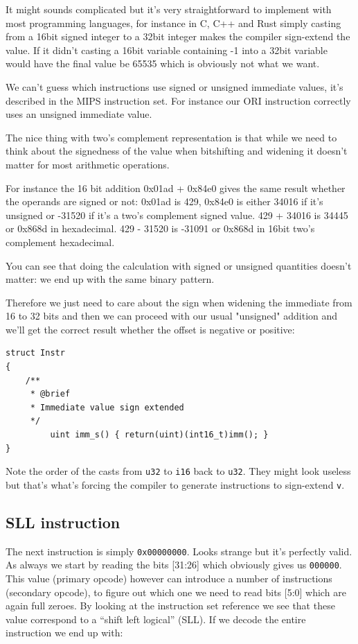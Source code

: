 \documentclass[a4paper]{article}
\newcommand{\code}[1] {\texttt{#1}}
\begin{document}
It might sounds complicated but it's very straightforward to implement
with most programming languages, for instance in C, C++ and Rust
simply casting from a 16bit signed integer to a 32bit integer makes
the compiler sign-extend the value. If it didn't casting a 16bit
variable containing -1 into a 32bit variable would have the final
value be 65535 which is obviously not what we want.

We can't guess which instructions use signed or unsigned immediate
values, it's described in the MIPS instruction set. For instance our
ORI instruction correctly uses an unsigned immediate value.

The nice thing with two's complement representation is that while we
need to think about the signedness of the value when bitshifting and
widening it doesn't matter for most arithmetic operations.

For instance the 16 bit addition 0x01ad + 0x84e0 gives the same result
whether the operands are signed or not: 0x01ad is 429, 0x84e0 is
either 34016 if it's unsigned or -31520 if it's a two's complement
signed value. 429 + 34016 is 34445 or 0x868d in hexadecimal. 429 -
31520 is -31091 or 0x868d in 16bit two's complement hexadecimal.

You can see that doing the calculation with signed or unsigned
quantities doesn't matter: we end up with the same binary pattern.

Therefore we just need to care about the sign when widening the
immediate from 16 to 32 bits and then we can proceed with our usual
"unsigned" addition and we'll get the correct result whether the
offset is negative or positive:

\begin{lstlisting}[caption={Signed immediate}, label={code:signedimm}]
struct Instr
{
	/**
	 * @brief
	 * Immediate value sign extended
	 */
         uint imm_s() { return(uint)(int16_t)imm(); }
}
\end{lstlisting}

Note the order of the casts from \code{u32} to \code{i16} back to
\code{u32}. They might look useless but that's what's forcing the
compiler to generate instructions to sign-extend \code{v}.

\subsection{SLL instruction}

The next instruction is simply \code{0x00000000}. Looks strange but
it's perfectly valid. As always we start by reading the bits [31:26]
which obviously gives us \code{000000}. This value (primary opcode) however can
introduce a number of instructions (secondary opcode), to figure out which one we need to
read bits [5:0] which are again full zeroes. By looking at the
instruction set reference we see that these value correspond to a
``shift left logical'' (SLL). If we decode the entire instruction we
end up with:
\end{document}
